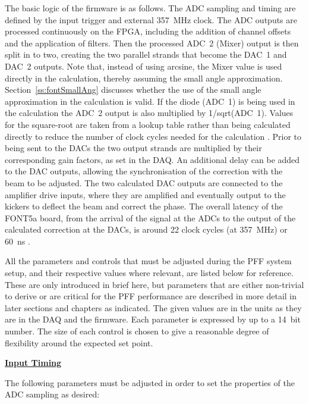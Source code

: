 The basic logic of the firmware is as follows. The ADC sampling and timing are defined by the input trigger and external 357~MHz clock. The ADC outputs are processed continuously on the FPGA, including the addition of channel offsets and the application of filters. Then the processed ADC~2 (Mixer) output is then split in to two, creating the two parallel strands that become the DAC~1 and DAC~2 outputs. Note that, instead of using arcsine, the Mixer value is used directly in the calculation, thereby assuming the small angle approximation. Section~\ref{ss:fontSmallAng} discusses whether the use of the small angle approximation in the calculation is valid. If the diode (ADC~1) is being used in the calculation the ADC~2 output is also multiplied by 1/sqrt(ADC~1). Values for the square-root are taken from a lookup table rather than being calculated directly to reduce the number of clock cycles needed for the calculation \cite{glennCLIC13}. Prior to being sent to the DACs the two output strands are multiplied by their corresponding gain factors, as set in the DAQ. An additional delay can be added to the DAC outputs, allowing the synchronisation of the correction with the beam to be adjusted. The two calculated DAC outputs are connected to the amplifier drive inputs, where they are amplified and eventually output to the kickers to deflect the beam and correct the phase. 
The overall latency of the FONT5a board, from the arrival of the signal at the ADCs to the output of the calculated correction at the DACs, is around 22 clock cycles (at 357~MHz) or 60~ns \cite{glennCLIC14}.


All the parameters and controls that must be adjusted during the PFF system setup, and their respective values where relevant, are listed below for reference. These are only introduced in brief here, but parameters that are either non-trivial to derive or are critical for the PFF performance are described in more detail in later sections and chapters as indicated. The given values are in the units as they are in the DAQ and the firmware. Each parameter is expressed by up to a 14~bit number. The size of each control is chosen to give a reasonable degree of flexibility around the expected set point. 

\vspace{0.2cm}
\noindent\underline{\textbf{Input Timing}}

\noindent The following parameters must be adjusted in order to set the properties of the ADC sampling as desired:

